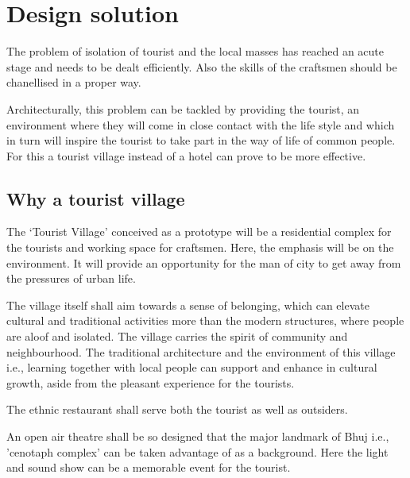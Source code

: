 \chapter{Design solution} %
\label{cha:ds}

The problem of isolation of tourist and the local masses has reached an acute stage and needs to be dealt efficiently. Also the skills of the craftsmen should be chanellised in a proper way.

Architecturally, this problem can be tackled by providing the tourist, an environment where they will come in close contact with the life style and which in turn will inspire the tourist to take part in the way of life of common people. For this a tourist village instead of a hotel can prove to be more effective.

\section{Why a tourist village} %
\label{sec:wtv}

The `Tourist Village' conceived as a prototype will be a residential complex for the tourists and working space for craftsmen. Here, the emphasis will be on the environment. It will provide an opportunity for the man of city to get away from the pressures of urban life.

The village itself shall aim towards a sense of belonging, which can elevate cultural and traditional activities more than the modern structures, where people are aloof and isolated. The village carries the spirit of community and neighbourhood. The traditional architecture and the environment of this village i.e., learning together with local people can support and enhance in cultural growth, aside from the pleasant experience for the tourists.

The ethnic restaurant shall serve both the tourist as well as outsiders.

An open air theatre shall be so designed that the major landmark of Bhuj i.e., 'cenotaph complex' can be taken advantage of as a background. Here the light and sound show can be a memorable event for the tourist.

